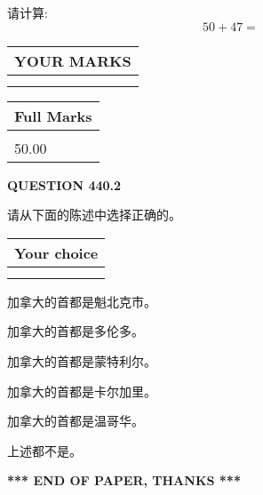 \documentclass{ctexart}
\begin{document}
  
 
请计算:
\begin{equation}
50 +  %
47 = \nonumber
\end{equation}
 

 

 
  
\vspace{0.2in}
  
\noindent\begin{tabular}{|l|}
\hline
 YOUR MARKS  \\
\hline
 \\ 
 \\ 
\hline
\end{tabular}
\hspace{0.05in} \begin{tabular}{|l|}
\hline
 Full Marks  \\
\hline
 \\ 
50.00 \\
\hline
\end{tabular}
{\textbf{\Large{QUESTION
440.2 
}}}
  
  
请从下面的陈述中选择正确的。
  
  
\noindent\hspace{3.0in} \begin{tabular}{|l|}
\hline
Your choice \\
\hline
 \\ 
 \\ 
\hline
\end{tabular}
  
  
 
 
加拿大的首都是魁北克市。
 
 
加拿大的首都是多伦多。
 
 
加拿大的首都是蒙特利尔。
 
 
加拿大的首都是卡尔加里。
 
 
加拿大的首都是温哥华。
 
 
 上述都不是。
 
 
   
   
 \vspace{0.2in}
 
   
   
   
   
\vspace{1.0in} 
{\textbf{\large{ *** END OF PAPER, THANKS *** }}} 
   
\end{document}
